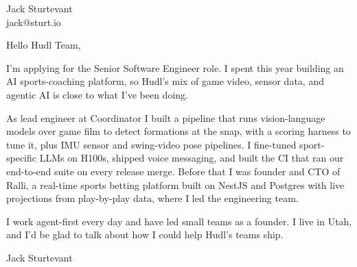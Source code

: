 \documentclass[11pt]{article}
\begin{document}
\raggedright

{\namefont\fontsize{20pt}{24pt}\selectfont Jack Sturtevant}\\[-0.3em]
jack@sturt.io

\vspace{1.2em}

Hello Hudl Team,

I'm applying for the Senior Software Engineer role. I spent this year building an AI sports-coaching platform, so Hudl's mix of game video, sensor data, and agentic AI is close to what I've been doing.

As lead engineer at Coordinator I built a pipeline that runs vision-language models over game film to detect formations at the snap, with a scoring harness to tune it, plus IMU sensor and swing-video pose pipelines. I fine-tuned sport-specific LLMs on H100s, shipped voice messaging, and built the CI that ran our end-to-end suite on every release merge. Before that I was founder and CTO of Ralli, a real-time sports betting platform built on NestJS and Postgres with live projections from play-by-play data, where I led the engineering team.

I work agent-first every day and have led small teams as a founder. I live in Utah, and I'd be glad to talk about how I could help Hudl's teams ship.

\vspace{0.6em}
Jack Sturtevant
\end{document}
